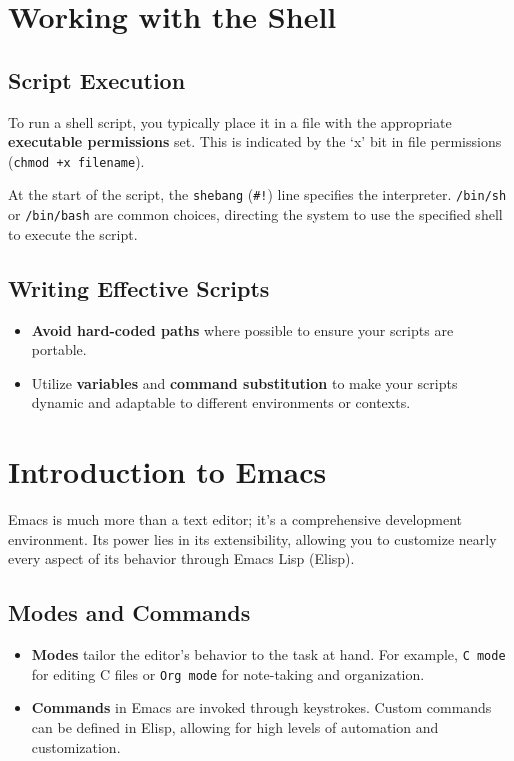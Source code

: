 \documentclass{article}
\begin{document}
\section{Working with the Shell}

\subsection{Script Execution}

To run a shell script, you typically place it in a file with the appropriate \textbf{executable permissions} set. This is indicated by the `x' bit in file permissions (\texttt{chmod +x filename}).

At the start of the script, the \texttt{shebang} (\texttt{\#!}) line specifies the interpreter. \texttt{/bin/sh} or \texttt{/bin/bash} are common choices, directing the system to use the specified shell to execute the script.

\subsection{Writing Effective Scripts}

\begin{itemize}
    \item \textbf{Avoid hard-coded paths} where possible to ensure your scripts are portable.
    \item Utilize \textbf{variables} and \textbf{command substitution} to make your scripts dynamic and adaptable to different environments or contexts.
\end{itemize}

\section{Introduction to Emacs}

Emacs is much more than a text editor; it's a comprehensive development environment. Its power lies in its extensibility, allowing you to customize nearly every aspect of its behavior through Emacs Lisp (Elisp).

\subsection{Modes and Commands}

\begin{itemize}
    \item \textbf{Modes} tailor the editor's behavior to the task at hand. For example, \texttt{C mode} for editing C files or \texttt{Org mode} for note-taking and organization.
    \item \textbf{Commands} in Emacs are invoked through keystrokes. Custom commands can be defined in Elisp, allowing for high levels of automation and customization.
\end{itemize}
\end{document}
